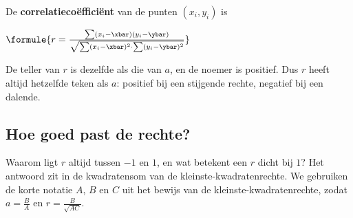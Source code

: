 \begin{theorie}
De \textbf{\textcolor{accent}{correlatiecoëfficiënt}} van de punten $(x_i, y_i)$ is

\vspace{1mm}
\qquad $\formule{r = \frac{\sum (x_i - \xbar)(y_i - \ybar)}{\sqrt{\sum (x_i - \xbar)^2 \cdot \sum (y_i - \ybar)^2}}}$
\end{theorie}

De teller van $r$ is dezelfde als die van $a$, en de noemer is positief. Dus $r$ heeft altijd hetzelfde teken als $a$: positief bij een stijgende rechte, negatief bij een dalende.


\begin{oefeningen}

\end{oefeningen}

\subsection{Hoe goed past de rechte?}

Waarom ligt $r$ altijd tussen $-1$ en $1$, en wat betekent een $r$ dicht bij $1$? Het antwoord zit in de kwadratensom van de kleinste-kwadratenrechte. We gebruiken de korte notatie $A$, $B$ en $C$ uit het bewijs van de kleinste-kwadratenrechte, zodat $a = \frac{B}{A}$ en $r = \frac{B}{\sqrt{AC}}$.

